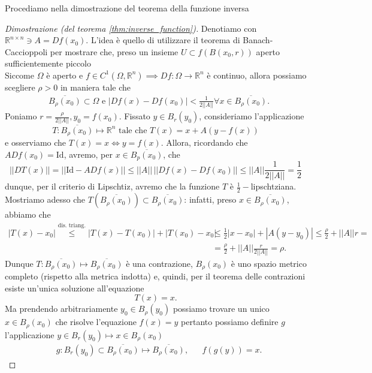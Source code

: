 Procediamo nella dimostrazione del teorema della funzione inversa
\begin{proof}[Dimostrazione (del teorema \ref{thm:inverse_function})]
	Denotiamo con $\mathbb{R}^{n \times n} \ni A = Df(x_0)$. L'idea è quello di utilizzare il teorema di Banach-Caccioppoli per mostrare che, preso un insieme $U \subset f(B(x_0, r))$ aperto sufficientemente piccolo\\
	Siccome $\Omega$ è aperto e $f \in C^1(\Omega, \mathbb{R}^n) \implies Df: \Omega \to \mathbb{R}^n$ è continuo, allora possiamo scegliere $\rho > 0$ in maniera tale che
	\begin{align*}
	&\overline{B_{\rho}(x_0)} \subset \Omega \text{    e    } |Df(x) - Df(x_0)| < \frac{1}{2 || A ||} \forall x \in \overline{B_\rho(x_0)}.
	\end{align*}
	Poniamo $r = \frac{\rho}{2 || A ||}, y_0 = f(x_0)$. Fissato $y \in B_r(y_0)$, consideriamo l'applicazione
	$$
	T : \overline{B_{\rho}(x_0)} \mapsto \mathbb{R}^n \text{ tale che } 	T(x) = x + A(y-f(x))
	$$
	e osserviamo che $T(x) = x \iff y=f(x)$. Allora, ricordando che $ADf(x_0) = \text{Id}$, avremo, per $x \in \overline{B_p(x_0)}$, che
	$$
	|| DT(x) || = || \text{Id} - ADf(x) ||  \leq || A || \, || Df(x) - Df(x_0) || \leq || A || \frac{1}{2 || A ||} = \frac{1}{2}
	$$
	dunque, per il criterio di Lipschtiz, avremo che la funzione $T$ è $\frac{1}{2}-$lipschtziana. Mostriamo adesso che $T(\overline{B_\rho(x_0)}) \subset \overline{B_\rho(x_0)}$: infatti, preso $x \in \overline{B_\rho(x_0)}$, abbiamo che
	\begin{align*}
	|T(x) - x_0| \stackrel{\text{dis. triang.}}{\leq} |T(x) - T(x_0)| + |T(x_0) - x_0| &\leq \frac{1}{2} |x-x_0| + |A(y - y_0)| \leq \frac{\rho}{2} + || A || r = \\
	&=\frac{\rho}{2} + || A || \frac{r}{2 || A ||} = \rho.
	\end{align*}
	Dunque $T : \overline{B_\rho(x_0)} \mapsto \overline{B_\rho(x_0)}$ è una contrazione, $B_\rho(x_0)$ è uno spazio metrico completo (rispetto alla metrica indotta) e, quindi, per il teorema delle contrazioni esiste un'unica soluzione all'equazione
	$$
		T(x) = x.
	$$
	Ma prendendo arbitrariamente $y_0 \in B_\rho(y_0)$ possiamo trovare un unico $x \in B_\rho(x_0)$ che risolve l'equazione $f(x) = y$
	pertanto possiamo definire $g$ l'applicazione $y \in B_{r}(y_0) \mapsto x \in B_{\rho}(x_0)$
	\begin{align*}
		&g: B_{r}(y_0) \subset \overline{B_{\rho} (x_0)} \mapsto \overline{B_\rho(x_0)}, & &f(g(y)) = x.
    \end{align*}

\end{proof}
